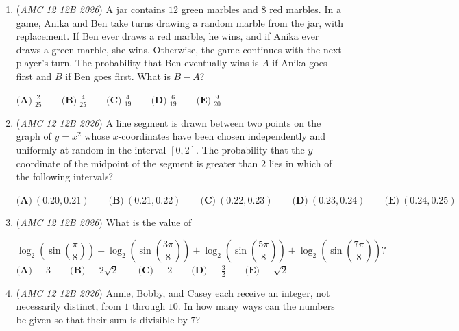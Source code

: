 \begin{enumerate}
 $\textbf{(A)}\   0  \qquad                 \textbf{(B)}\   \frac{\sqrt{3}}{2}  \qquad                 \textbf{(C)}\   1  \qquad                 \textbf{(D)}\   \sqrt{3}  \qquad                 \textbf{(E)}\   2$


	\item (\textit{AMC 12 12B 2026}) A jar contains $12$ green marbles and $8$ red marbles. In a game, Anika and Ben take turns drawing a random marble from the jar, with replacement. If Ben ever draws a red marble, he wins, and if Anika ever draws a green marble, she wins. Otherwise, the game continues with the next player's turn. The probability that Ben eventually wins is $A$ if Anika goes first and $B$ if Ben goes first. What is $B - A$?


 $\textbf{(A)}\   \frac{2}{25}  \qquad                 \textbf{(B)}\   \frac{4}{25}  \qquad                 \textbf{(C)}\   \frac{4}{19}  \qquad                 \textbf{(D)}\   \frac{6}{19}  \qquad                 \textbf{(E)}\   \frac{9}{20}$


	\item (\textit{AMC 12 12B 2026}) A line segment is drawn between two points on the graph of $y = x^{2}$ whose $x$-coordinates have been chosen independently and uniformly at random in the interval $[0,2]$. The probability that the $y$-coordinate of the midpoint of the segment is greater than $2$ lies in which of the following intervals?


 $\textbf{(A)}\   (0.20, 0.21)  \qquad                 \textbf{(B)}\   (0.21, 0.22)  \qquad                 \textbf{(C)}\   (0.22, 0.23)  \qquad                 \textbf{(D)}\   (0.23, 0.24)  \qquad                 \textbf{(E)}\   (0.24, 0.25)$


	\item (\textit{AMC 12 12B 2026}) What is the value of

 \[\log_{2}\left( \sin\left( \frac{\pi}{8} \right)  \right) + \log_{2}\left( \sin\left( \frac{3\pi}{8} \right)  \right) + \log_{2}\left( \sin\left( \frac{5\pi}{8} \right)  \right) + \log_{2}\left( \sin\left( \frac{7\pi}{8} \right)  \right)?\]
$\textbf{(A)}\   -3  \qquad                 \textbf{(B)}\   -2\sqrt{2}  \qquad                 \textbf{(C)}\   -2  \qquad                 \textbf{(D)}\   -\frac{3}{2}  \qquad                 \textbf{(E)}\   -\sqrt{2}$


	\item (\textit{AMC 12 12B 2026}) Annie, Bobby, and Casey each receive an integer, not necessarily distinct, from $1$ through $10$. In how many ways can the numbers be given so that their sum is divisible by $7$?



\end{enumerate}
